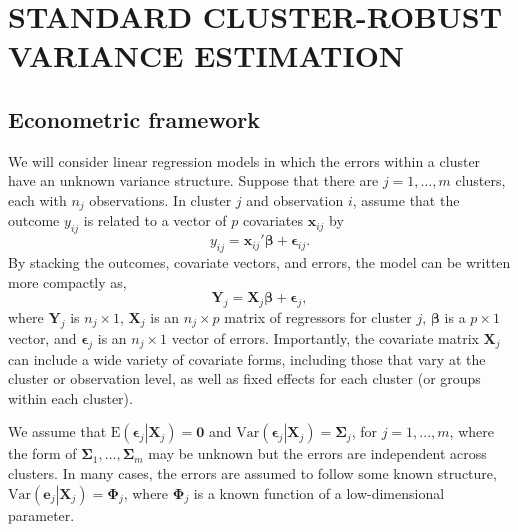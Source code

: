 \documentclass[12pt]{article}
\newcommand{\E}{\text{E}}
\newcommand{\Var}{\text{Var}}
\newcommand{\bm}{\mathbf}
\newcommand{\bs}{\boldsymbol}
\begin{document}
\section{STANDARD CLUSTER-ROBUST VARIANCE ESTIMATION}
\label{sec:CRVE}

\subsection{Econometric framework}

We will consider linear regression models in which the errors within a cluster have an unknown variance structure. 
Suppose that there are $j=1,...,m$ clusters, each with $n_j$ observations. In cluster $j$ and observation $i$, assume that the outcome $y_{ij}$ is related to a vector of $p$ covariates $\bm{x}_{ij}$ by
\begin{equation}
\label{eq:model_vector}
y_{ij} = \bm{x}_{ij}' \bs\beta + \bs\epsilon_{ij}.
\end{equation}
By stacking the outcomes, covariate vectors, and errors, the model can be written more compactly as,
\begin{equation}
\label{eq:model_vector}
\bm{Y}_j = \bm{X}_j \bs\beta + \bs\epsilon_j,
\end{equation}
where $\bm{Y}_j$ is $n_j \times 1$, $\bm{X}_j$ is an $n_j \times p$ matrix of regressors for cluster $j$, $\bs\beta$ is a $p \times 1$ vector, and $\bs\epsilon_j$ is an $n_j \times 1$ vector of errors. 
Importantly, the covariate matrix $\bm{X}_j$ can include a wide variety of covariate forms, including those that vary at the cluster or observation level, as well as fixed effects for each cluster (or groups within each cluster).

We assume that $\E\left(\bs\epsilon_j\left|\bm{X}_j\right.\right) = \bm{0}$ and $\Var\left(\bs\epsilon_j\left|\bm{X}_j\right.\right) = \bs\Sigma_j$, for $j = 1,...,m$, where the form of $\bs\Sigma_1,...,\bs\Sigma_m$ may be unknown but the errors are independent across clusters. 
In many cases, the errors are assumed to follow some known structure, $\Var\left(\bm{e}_j\left|\bm{X}_j\right.\right) = \bs\Phi_j$, where $\bs\Phi_j$ is a known function of a low-dimensional parameter. %

\end{document}
